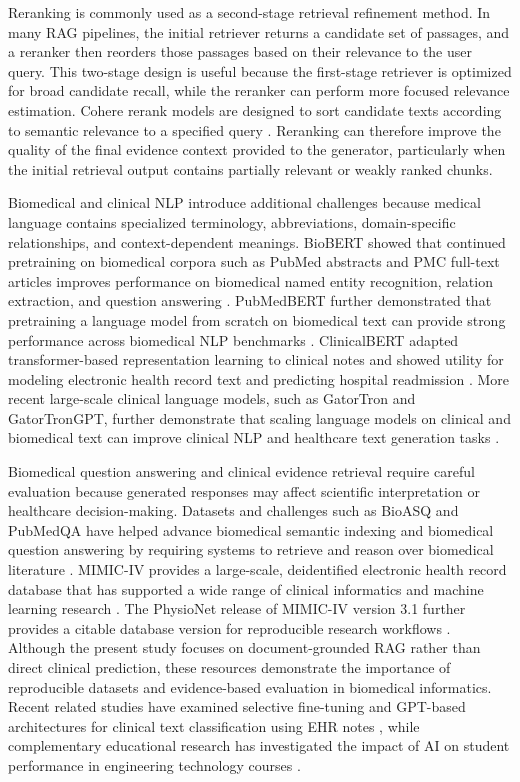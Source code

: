 Reranking is commonly used as a second-stage retrieval refinement method. In many RAG pipelines, the initial retriever returns a candidate set of passages, and a reranker then reorders those passages based on their relevance to the user query. This two-stage design is useful because the first-stage retriever is optimized for broad candidate recall, while the reranker can perform more focused relevance estimation. Cohere rerank models are designed to sort candidate texts according to semantic relevance to a specified query \cite{coherererank}. Reranking can therefore improve the quality of the final evidence context provided to the generator, particularly when the initial retrieval output contains partially relevant or weakly ranked chunks.

Biomedical and clinical NLP introduce additional challenges because medical language contains specialized terminology, abbreviations, domain-specific relationships, and context-dependent meanings. BioBERT showed that continued pretraining on biomedical corpora such as PubMed abstracts and PMC full-text articles improves performance on biomedical named entity recognition, relation extraction, and question answering \cite{lee2020biobert}. PubMedBERT further demonstrated that pretraining a language model from scratch on biomedical text can provide strong performance across biomedical NLP benchmarks \cite{gu2021pubmedbert}. ClinicalBERT adapted transformer-based representation learning to clinical notes and showed utility for modeling electronic health record text and predicting hospital readmission \cite{huang2019clinicalbert}. More recent large-scale clinical language models, such as GatorTron and GatorTronGPT, further demonstrate that scaling language models on clinical and biomedical text can improve clinical NLP and healthcare text generation tasks \cite{yang2022gatortron,peng2023gatortrongpt}.

Biomedical question answering and clinical evidence retrieval require careful evaluation because generated responses may affect scientific interpretation or healthcare decision-making. Datasets and challenges such as BioASQ and PubMedQA have helped advance biomedical semantic indexing and biomedical question answering by requiring systems to retrieve and reason over biomedical literature \cite{tsatsaronis2015bioasq,jin2019pubmedqa}. MIMIC-IV provides a large-scale, deidentified electronic health record database that has supported a wide range of clinical informatics and machine learning research \cite{johnson2023mimiciv}. The PhysioNet release of MIMIC-IV version 3.1 further provides a citable database version for reproducible research workflows \cite{johnson2024mimiciv}. Although the present study focuses on document-grounded RAG rather than direct clinical prediction, these resources demonstrate the importance of reproducible datasets and evidence-based evaluation in biomedical informatics. Recent related studies have examined selective fine-tuning and GPT-based architectures for clinical text classification using EHR notes \cite{irany2026selective,irany2026generative}, while complementary educational research has investigated the impact of AI on student performance in engineering technology courses \cite{hossain2025impact}.

